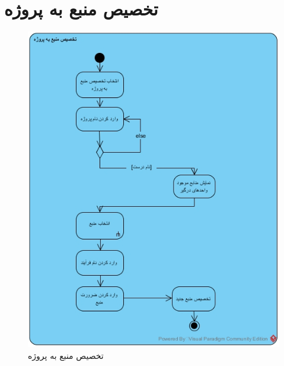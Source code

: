 \section{تخصیص منبع به پروژه}
\begin{figure}[H]
	\centering
	\includegraphics[scale=0.8]{img/activity/assres}
	\caption{تخصیص منبع به پروژه}
\end{figure}

